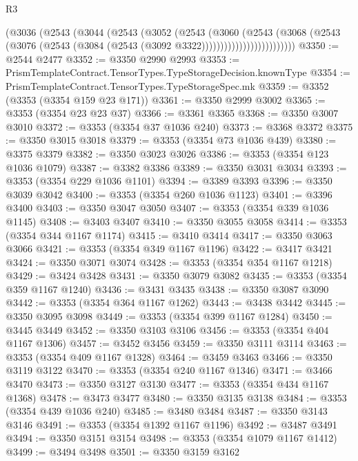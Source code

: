 \begin{lexlean}{R3}
\begin{coremodule}
                        (@3036
                          (@2543
                            (@3044
                              (@2543
                                (@3052
                                  (@2543
                                    (@3060
                                      (@2543
                                        (@3068
                                          (@2543
                                            (@3076
                                              (@2543
                                                (@3084 (@2543 (@3092 @3322)))))))))))))))))))))))))
@3350 := @2544 @2477
@3352 := @3350 @2990 @2993
@3353 := PrismTemplateContract.TensorTypes.TypeStorageDecision.knownType
@3354 := PrismTemplateContract.TensorTypes.TypeStorageSpec.mk
@3359 := @3352 (@3353 (@3354 @159 @23 @171))
@3361 := @3350 @2999 @3002
@3365 := @3353 (@3354 @23 @23 @37)
@3366 := @3361 @3365
@3368 := @3350 @3007 @3010
@3372 := @3353 (@3354 @37 @1036 @240)
@3373 := @3368 @3372
@3375 := @3350 @3015 @3018
@3379 := @3353 (@3354 @73 @1036 @439)
@3380 := @3375 @3379
@3382 := @3350 @3023 @3026
@3386 := @3353 (@3354 @123 @1036 @1079)
@3387 := @3382 @3386
@3389 := @3350 @3031 @3034
@3393 := @3353 (@3354 @229 @1036 @1101)
@3394 := @3389 @3393
@3396 := @3350 @3039 @3042
@3400 := @3353 (@3354 @260 @1036 @1123)
@3401 := @3396 @3400
@3403 := @3350 @3047 @3050
@3407 := @3353 (@3354 @339 @1036 @1145)
@3408 := @3403 @3407
@3410 := @3350 @3055 @3058
@3414 := @3353 (@3354 @344 @1167 @1174)
@3415 := @3410 @3414
@3417 := @3350 @3063 @3066
@3421 := @3353 (@3354 @349 @1167 @1196)
@3422 := @3417 @3421
@3424 := @3350 @3071 @3074
@3428 := @3353 (@3354 @354 @1167 @1218)
@3429 := @3424 @3428
@3431 := @3350 @3079 @3082
@3435 := @3353 (@3354 @359 @1167 @1240)
@3436 := @3431 @3435
@3438 := @3350 @3087 @3090
@3442 := @3353 (@3354 @364 @1167 @1262)
@3443 := @3438 @3442
@3445 := @3350 @3095 @3098
@3449 := @3353 (@3354 @399 @1167 @1284)
@3450 := @3445 @3449
@3452 := @3350 @3103 @3106
@3456 := @3353 (@3354 @404 @1167 @1306)
@3457 := @3452 @3456
@3459 := @3350 @3111 @3114
@3463 := @3353 (@3354 @409 @1167 @1328)
@3464 := @3459 @3463
@3466 := @3350 @3119 @3122
@3470 := @3353 (@3354 @240 @1167 @1346)
@3471 := @3466 @3470
@3473 := @3350 @3127 @3130
@3477 := @3353 (@3354 @434 @1167 @1368)
@3478 := @3473 @3477
@3480 := @3350 @3135 @3138
@3484 := @3353 (@3354 @439 @1036 @240)
@3485 := @3480 @3484
@3487 := @3350 @3143 @3146
@3491 := @3353 (@3354 @1392 @1167 @1196)
@3492 := @3487 @3491
@3494 := @3350 @3151 @3154
@3498 := @3353 (@3354 @1079 @1167 @1412)
@3499 := @3494 @3498
@3501 := @3350 @3159 @3162

\end{coremodule}
\end{lexlean}
